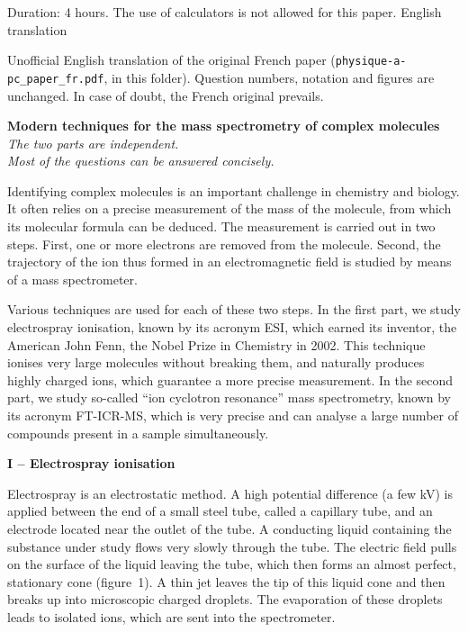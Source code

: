 \documentclass[11pt,a4paper]{article}
\begin{document}
         {Duration: 4 hours. The use of calculators is not allowed for this paper.}
         {English translation}

\begin{remark}
Unofficial English translation of the original French paper
(\texttt{physique-a-pc\_paper\_fr.pdf}, in this folder). Question numbers, notation and figures
are unchanged. In case of doubt, the French original prevails.
\end{remark}

\begin{center}
{\large\bfseries Modern techniques for the mass spectrometry of complex molecules}\\[6pt]
\emph{The two parts are independent.}\\
\emph{Most of the questions can be answered concisely.}
\end{center}

Identifying complex molecules is an important challenge in chemistry and biology. It often
relies on a precise measurement of the mass of the molecule, from which its molecular formula
can be deduced. The measurement is carried out in two steps. First, one or more electrons are
removed from the molecule. Second, the trajectory of the ion thus formed in an electromagnetic
field is studied by means of a mass spectrometer.

Various techniques are used for each of these two steps. In the first part, we study
electrospray ionisation, known by its acronym ESI, which earned its inventor, the American
John Fenn, the Nobel Prize in Chemistry in 2002. This technique ionises very large molecules
without breaking them, and naturally produces highly charged ions, which guarantee a more
precise measurement. In the second part, we study so-called ``ion cyclotron resonance'' mass
spectrometry, known by its acronym FT-ICR-MS, which is very precise and can analyse a large
number of compounds present in a sample simultaneously.

\begin{center}\bfseries I -- Electrospray ionisation\end{center}

Electrospray is an electrostatic method. A high potential difference (a few kV) is applied
between the end of a small steel tube, called a capillary tube, and an electrode located near
the outlet of the tube. A conducting liquid containing the substance under study flows very
slowly through the tube. The electric field pulls on the surface of the liquid leaving the
tube, which then forms an almost perfect, stationary cone (figure~1). A thin jet leaves the
tip of this liquid cone and then breaks up into microscopic charged droplets. The evaporation
of these droplets leads to isolated ions, which are sent into the spectrometer.
\end{document}
